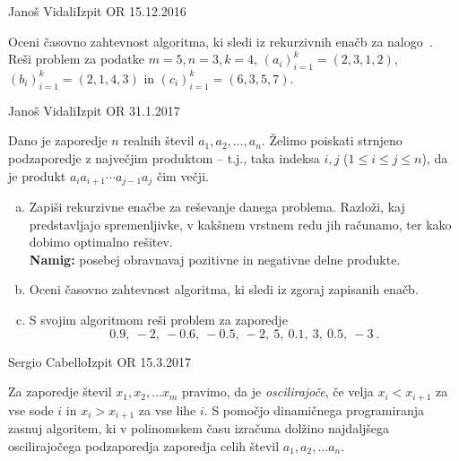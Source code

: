 \begin{naloga}{Janoš Vidali}{Izpit OR 15.12.2016}
\begin{vprasanje}
Oceni časovno zahtevnost algoritma,
ki sledi iz rekurzivnih enačb za nalogo~.
Reši problem za podatke $m = 5, n = 3, k = 4$,
$(a_i)_{i=1}^k = (2, 3, 1, 2)$, $(b_i)_{i=1}^k = (2, 1, 4, 3)$
in $(c_i)_{i=1}^k = (6, 3, 5, 7)$.
\end{vprasanje}
\begin{odgovor}
\end{odgovor}
\end{naloga}


\begin{naloga}{Janoš Vidali}{Izpit OR 31.1.2017}
\begin{vprasanje}
Dano je zaporedje $n$ realnih števil $a_1, a_2, \dots, a_n$.
Želimo poiskati strnjeno podzaporedje z največjim produktom
-- t.j., taka indeksa $i, j$ ($1 \le i \le j \le n$),
da je produkt $a_i a_{i+1} \cdots a_{j-1} a_j$ čim večji.

\begin{enumerate}[(a)]
\item Zapiši rekurzivne enačbe za reševanje danega problema.
Razloži, kaj predstavljajo spremenljivke,
v kakšnem vrstnem redu jih računamo,
ter kako dobimo optimalno rešitev. \\
{\small {\bf Namig:}
posebej obravnavaj pozitivne in negativne delne produkte.}

\item Oceni časovno zahtevnost algoritma, ki sledi iz zgoraj zapisanih enačb.

\item S svojim algoritmom reši problem za zaporedje
$$
0.9, \ -2, \ -0.6, \ -0.5, \ -2, \ 5, \ 0.1, \ 3, \ 0.5, \ -3 \ .
$$
\end{enumerate}
\end{vprasanje}
\begin{odgovor}
\end{odgovor}
\end{naloga}


\begin{naloga}{Sergio Cabello}{Izpit OR 15.3.2017}
\begin{vprasanje}
Za zaporedje števil $x_1, x_2, \dots x_m$ pravimo, da je {\em oscilirajoče},
če velja $x_i < x_{i+1}$ za vse sode $i$ in $x_i > x_{i+1}$ za vse lihe $i$.
S pomočjo dinamičnega programiranja zasnuj algoritem,
ki v polinomskem času izračuna dolžino najdaljšega oscilirajočega podzaporedja
zaporedja celih števil $a_1, a_2, \dots a_n$.
\end{vprasanje}
\begin{odgovor}
\end{odgovor}
\end{naloga}


